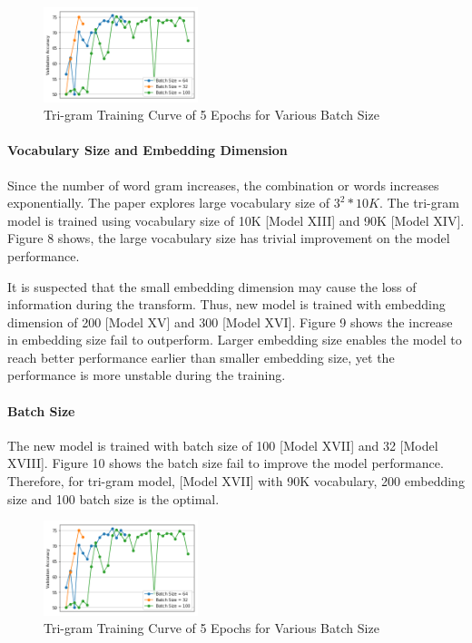 \documentclass[10pt]{article}
\begin{document}
\begin{figure} 

   \includegraphics[width=0.4\textwidth,right]{plot10}
   \caption{Tri-gram Training Curve of 5 Epochs for Various Batch Size}

\end{figure} 
\paragraph{Vocabulary Size and Embedding Dimension}

Since the number of word gram increases, the combination or words increases exponentially. The paper explores large vocabulary size of \(3^2 * 10K\). The tri-gram model is trained using vocabulary size of 10K [Model XIII] and 90K [Model XIV]. Figure 8 shows, the large vocabulary size has trivial improvement on the model performance. \par


It is suspected that the small embedding dimension may cause the loss of information during the transform. Thus, new model is trained with embedding dimension of 200 [Model XV] and 300 [Model XVI]. Figure 9 shows the increase in embedding size fail to outperform. Larger embedding size enables the model to reach better performance earlier than smaller embedding size, yet the performance is more unstable during the training.



\paragraph{Batch Size}
The new model is trained with batch size of 100 [Model XVII] and 32 [Model XVIII]. Figure 10 shows the batch size fail to improve the model performance. Therefore, for tri-gram model, [Model XVII] with 90K vocabulary, 200 embedding size and 100 batch size is the optimal.

\begin{figure} 

   \includegraphics[width=0.4\textwidth,right]{plot10}
   \caption{Tri-gram Training Curve of 5 Epochs for Various Batch Size}

\end{figure} 
\end{document}
